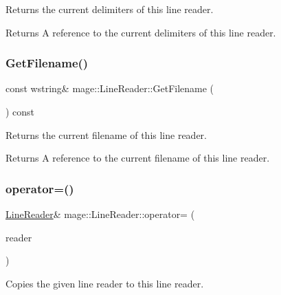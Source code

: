 Returns the current delimiters of this line reader.

\begin{DoxyReturn}{Returns}
A reference to the current delimiters of this line reader. 
\end{DoxyReturn}
\hypertarget{classmage_1_1_line_reader_a682ed8030c99a62d4409a01f9efa6d6b}{}\label{classmage_1_1_line_reader_a682ed8030c99a62d4409a01f9efa6d6b} 
\subsubsection{\texorpdfstring{Get\+Filename()}{GetFilename()}}
{\footnotesize\ttfamily const wstring\& mage\+::\+Line\+Reader\+::\+Get\+Filename (\begin{DoxyParamCaption}{ }\end{DoxyParamCaption}) const\hspace{0.3cm}{\ttfamily [noexcept]}}

Returns the current filename of this line reader.

\begin{DoxyReturn}{Returns}
A reference to the current filename of this line reader. 
\end{DoxyReturn}
\hypertarget{classmage_1_1_line_reader_a2247078d0b5602f9a9a6b74019832faf}{}\label{classmage_1_1_line_reader_a2247078d0b5602f9a9a6b74019832faf} 
\subsubsection{\texorpdfstring{operator=()}{operator=()}\hspace{0.1cm}{\footnotesize\ttfamily [1/2]}}
{\footnotesize\ttfamily \hyperlink{classmage_1_1_line_reader}{Line\+Reader}\& mage\+::\+Line\+Reader\+::operator= (\begin{DoxyParamCaption}\item[{const \hyperlink{classmage_1_1_line_reader}{Line\+Reader} \&}]{reader }\end{DoxyParamCaption})\hspace{0.3cm}{\ttfamily [delete]}}

Copies the given line reader to this line reader.


